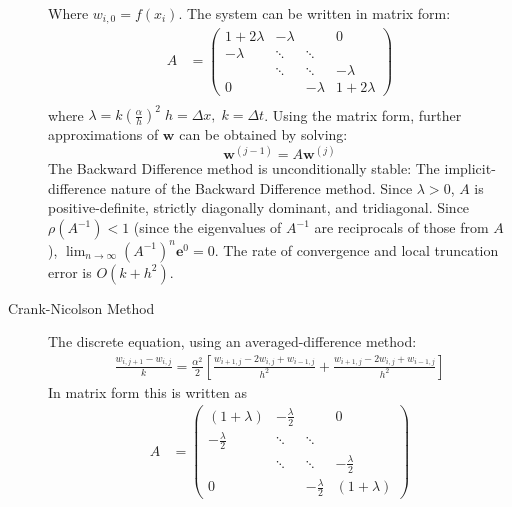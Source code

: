 \documentclass[8pt]{article}
\begin{document}
\begin{multicols}{2}
\begin{description}
    Where $w_{i,0}=f(x_i)$. The system can be written in matrix form:
    \begin{equation*}
      \begin{aligned}
        A&=
        \begin{pmatrix}
            1+2\lambda & -\lambda & & 0\\
            -\lambda& \ddots & \ddots & \\
            & \ddots & \ddots & -\lambda\\
            0 & & -\lambda & 1+2\lambda
          \end{pmatrix} \\
      \end{aligned}
    \end{equation*}
    where $\lambda = k\left(\frac{\alpha}{h}\right)^2\;h=\Delta
    x,\;k=\Delta t$. Using the matrix form, further approximations of
    $\mathbf{w}$ can be obtained by solving:
    $$ \mathbf{w}^{(j-1)} = A\mathbf{w}^{(j)} $$
    The Backward Difference method is unconditionally stable: The
    implicit-difference nature of the Backward Difference
    method. Since $\lambda>0$, $A$ is positive-definite, strictly
    diagonally dominant, and tridiagonal. Since $\rho(A^{-1})<1$ (since
    the eigenvalues of $A^{-1}$ are reciprocals of those from $A$),
    $\lim_{n\rightarrow\infty}(A^{-1})^n\mathbf{e}^{0}=0$. The rate of
    convergence and local truncation error is $O(k+h^2)$.
  \item[Crank-Nicolson Method] The discrete equation, using an
    averaged-difference method:
    \begin{equation*}
      \begin{array}{c}
        \frac{w_{i,j+1}-w_{i,j}}{k}=\frac{\alpha^2}{2} \left[\frac{w_{i+1,j}-2w_{i,j}+w_{i-1,j}}{h^2} + \frac{w_{i+1,j}-2w_{i,j}+w_{i-1,j}}{h^2}\right]
      \end{array}
    \end{equation*}
    In matrix form this is written as
    \begin{equation*}
      \begin{aligned}
        A&=
        \begin{pmatrix}
          (1+\lambda) & -\frac{\lambda}{2} & & 0\\
          -\frac{\lambda}{2} & \ddots & \ddots & \\
          & \ddots & \ddots & -\frac{\lambda}{2}\\
          0 & & -\frac{\lambda}{2} & (1+\lambda)
        \end{pmatrix} \\

\end{aligned}
\end{equation*}
\end{description}
\end{multicols}
\end{document}
